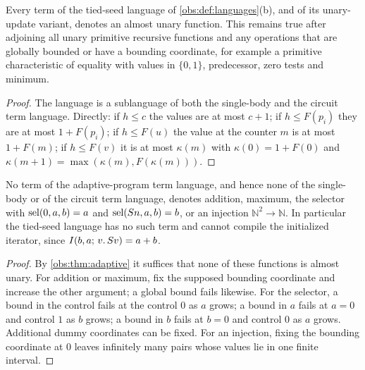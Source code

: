 \begin{corollary}
\label{obs:cor:tied-seed}
Every term of the tied-seed language of \cref{obs:def:languages}(b), and of its
unary-update variant, denotes an almost unary function. This remains true after
adjoining all unary primitive recursive functions and any operations that are
globally bounded or have a bounding coordinate, for example a primitive
characteristic of equality with values in $\{0,1\}$, predecessor, zero tests
and minimum.
\end{corollary}

\begin{proof}
The language is a sublanguage of both the single-body and the circuit term
language. Directly: if $h\le c$ the values are at most $c+1$; if
$h\le F(p_i)$ they are at most $1+F(p_i)$; if $h\le F(u)$ the value at the
counter $m$ is at most $1+F(m)$; if $h\le F(v)$ it is at most $\kappa(m)$ with
$\kappa(0)=1+F(0)$ and $\kappa(m+1)=\max(\kappa(m),F(\kappa(m)))$.
\end{proof}

\begin{corollary}
\label{obs:cor:no-addition}
No term of the adaptive-program term language, and hence none of the
single-body or of the circuit term language, denotes addition, maximum, the
selector with $\operatorname{sel}(0,a,b)=a$ and $\operatorname{sel}(S n,a,b)=b$, or an injection
$\mathbb{N}^2\to\mathbb{N}$. In particular the tied-seed language has no such
term and cannot compile the initialized iterator, since
$I(b,a;\,v.\,S v)=a+b$.
\end{corollary}

\begin{proof}
By \cref{obs:thm:adaptive} it suffices that none of these functions is almost
unary. For addition or maximum, fix the supposed bounding coordinate and increase the
other argument; a global bound fails likewise. For the selector, a bound in the
control fails at the control $0$ as $a$ grows; a bound in $a$ fails at $a=0$
and control $1$ as $b$ grows; a bound in $b$ fails at $b=0$ and control $0$ as
$a$ grows. Additional dummy coordinates can be fixed. For an injection, fixing
the bounding coordinate at $0$ leaves infinitely many pairs whose values lie in
one finite interval.
\end{proof}

